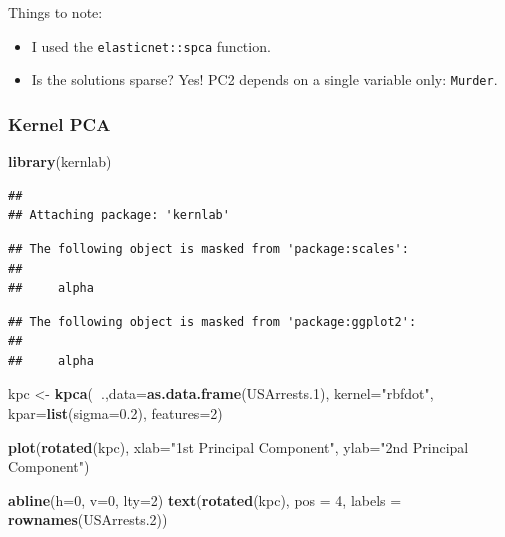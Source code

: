 \documentclass[]{book}
\newenvironment{Shaded}{\begin{snugshade}}{\end{snugshade}}
\newcommand{\DataTypeTok}[1]{\textcolor[rgb]{0.13,0.29,0.53}{#1}}
\newcommand{\DecValTok}[1]{\textcolor[rgb]{0.00,0.00,0.81}{#1}}
\newcommand{\FloatTok}[1]{\textcolor[rgb]{0.00,0.00,0.81}{#1}}
\newcommand{\KeywordTok}[1]{\textcolor[rgb]{0.13,0.29,0.53}{\textbf{#1}}}
\newcommand{\NormalTok}[1]{#1}
\newcommand{\OperatorTok}[1]{\textcolor[rgb]{0.81,0.36,0.00}{\textbf{#1}}}
\newcommand{\StringTok}[1]{\textcolor[rgb]{0.31,0.60,0.02}{#1}}
\providecommand{\tightlist}{%
  \setlength{\itemsep}{0pt}\setlength{\parskip}{0pt}}
\theoremstyle{definition}
\theoremstyle{definition}
\theoremstyle{definition}
\theoremstyle{remark}
\begin{document}
Things to note:

\begin{itemize}
\tightlist
\item
  I used the \texttt{elasticnet::spca} function.
\item
  Is the solutions sparse? Yes! PC2 depends on a single variable only: \texttt{Murder}.
\end{itemize}

\hypertarget{kernel-pca}{%
\subsubsection{Kernel PCA}\label{kernel-pca}}

\begin{Shaded}
\begin{Highlighting}[]
\KeywordTok{library}\NormalTok{(kernlab)}
\end{Highlighting}
\end{Shaded}

\begin{verbatim}
## 
## Attaching package: 'kernlab'
\end{verbatim}

\begin{verbatim}
## The following object is masked from 'package:scales':
## 
##     alpha
\end{verbatim}

\begin{verbatim}
## The following object is masked from 'package:ggplot2':
## 
##     alpha
\end{verbatim}

\begin{Shaded}
\begin{Highlighting}[]
\NormalTok{kpc <-}\StringTok{ }\KeywordTok{kpca}\NormalTok{(}\OperatorTok{~}\NormalTok{.,}\DataTypeTok{data=}\KeywordTok{as.data.frame}\NormalTok{(USArrests}\FloatTok{.1}\NormalTok{), }\DataTypeTok{kernel=}\StringTok{"rbfdot"}\NormalTok{, }\DataTypeTok{kpar=}\KeywordTok{list}\NormalTok{(}\DataTypeTok{sigma=}\FloatTok{0.2}\NormalTok{), }\DataTypeTok{features=}\DecValTok{2}\NormalTok{)}

\KeywordTok{plot}\NormalTok{(}\KeywordTok{rotated}\NormalTok{(kpc),}
     \DataTypeTok{xlab=}\StringTok{"1st Principal Component"}\NormalTok{,}
     \DataTypeTok{ylab=}\StringTok{"2nd Principal Component"}\NormalTok{)}

\KeywordTok{abline}\NormalTok{(}\DataTypeTok{h=}\DecValTok{0}\NormalTok{, }\DataTypeTok{v=}\DecValTok{0}\NormalTok{, }\DataTypeTok{lty=}\DecValTok{2}\NormalTok{)}
\KeywordTok{text}\NormalTok{(}\KeywordTok{rotated}\NormalTok{(kpc), }\DataTypeTok{pos =} \DecValTok{4}\NormalTok{, }\DataTypeTok{labels =} \KeywordTok{rownames}\NormalTok{(USArrests}\FloatTok{.2}\NormalTok{))}
\end{Highlighting}
\end{Shaded}
\end{document}
